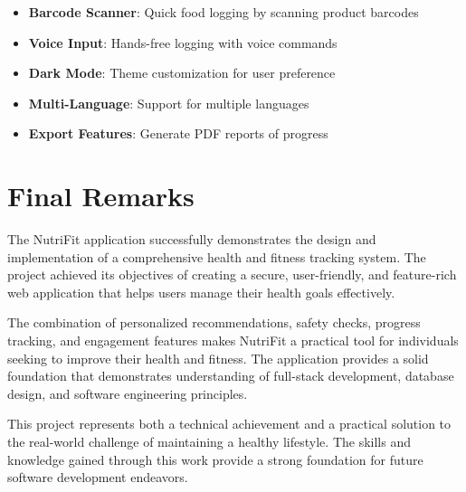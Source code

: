 \begin{itemize}
    \item \textbf{Barcode Scanner}: Quick food logging by scanning product barcodes
    \item \textbf{Voice Input}: Hands-free logging with voice commands
    \item \textbf{Dark Mode}: Theme customization for user preference
    \item \textbf{Multi-Language}: Support for multiple languages
    \item \textbf{Export Features}: Generate PDF reports of progress
\end{itemize}

\section{Final Remarks}

The NutriFit application successfully demonstrates the design and implementation of a comprehensive health and fitness tracking system. The project achieved its objectives of creating a secure, user-friendly, and feature-rich web application that helps users manage their health goals effectively.

The combination of personalized recommendations, safety checks, progress tracking, and engagement features makes NutriFit a practical tool for individuals seeking to improve their health and fitness. The application provides a solid foundation that demonstrates understanding of full-stack development, database design, and software engineering principles.

This project represents both a technical achievement and a practical solution to the real-world challenge of maintaining a healthy lifestyle. The skills and knowledge gained through this work provide a strong foundation for future software development endeavors.
